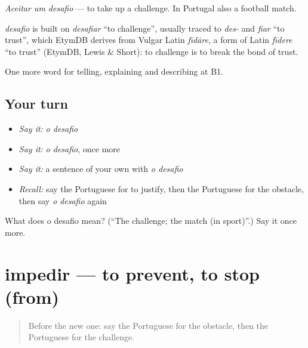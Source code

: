 \emph{Aceitar um desafio} — to take up a challenge. In Portugal also a football match.

\begin{cousinweb}
\emph{desafio} is built on \emph{desafiar} \textquotedblleft{}to challenge\textquotedblright{}, usually traced to \emph{des-} and \emph{fiar} \textquotedblleft{}to trust\textquotedblright{}, which EtymDB derives from Vulgar Latin \emph{fīdāre}, a form of Latin \emph{fīdere} \textquotedblleft{}to trust\textquotedblright{} (EtymDB, Lewis \& Short): to challenge is to break the bond of trust.
\end{cousinweb}

\begin{grammarlens}[title={What you've built}]
One more word for telling, explaining and describing at B1.
\end{grammarlens}

\subsection*{Your turn}
\begin{itemize}
\raggedright
  \item \emph{Say it:} \emph{o desafio}
  \item \emph{Say it:} \emph{o desafio}, once more
  \item \emph{Say it:} a sentence of your own with \emph{o desafio}
  \item \emph{Recall:} say the Portuguese for to justify, then the Portuguese for the obstacle, then say \emph{o desafio} again
\end{itemize}

\begin{tcolorbox}[breakable,colback=teal!4,colframe=teal!35!black,title={Before you move on}]
What does o desafio mean? (\textquotedblleft{}The challenge; the match (in sport)\textquotedblright{}.) Say it once more.
\end{tcolorbox}
\section[impedir]{impedir — to prevent, to stop (from)}

\label{lesson:PT-C353-impedir}



\begin{quote}
Before the new one: say the Portuguese for the obstacle, then the Portuguese for the challenge.
\end{quote}

